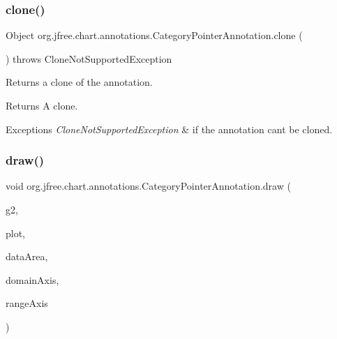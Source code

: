 \subsubsection{\texorpdfstring{clone()}{clone()}}
{\footnotesize\ttfamily Object org.\+jfree.\+chart.\+annotations.\+Category\+Pointer\+Annotation.\+clone (\begin{DoxyParamCaption}{ }\end{DoxyParamCaption}) throws Clone\+Not\+Supported\+Exception}

Returns a clone of the annotation.

\begin{DoxyReturn}{Returns}
A clone.
\end{DoxyReturn}

\begin{DoxyExceptions}{Exceptions}
{\em Clone\+Not\+Supported\+Exception} & if the annotation can\textquotesingle{}t be cloned. \\
\hline
\end{DoxyExceptions}
\mbox{\label{classorg_1_1jfree_1_1chart_1_1annotations_1_1_category_pointer_annotation_a601e21ffb2b2ee40f8ba7f0a6bd97626}} 
\subsubsection{\texorpdfstring{draw()}{draw()}}
{\footnotesize\ttfamily void org.\+jfree.\+chart.\+annotations.\+Category\+Pointer\+Annotation.\+draw (\begin{DoxyParamCaption}\item[{Graphics2D}]{g2,  }\item[{\mbox{\hyperlink{classorg_1_1jfree_1_1chart_1_1plot_1_1_category_plot}{Category\+Plot}}}]{plot,  }\item[{Rectangle2D}]{data\+Area,  }\item[{\mbox{\hyperlink{classorg_1_1jfree_1_1chart_1_1axis_1_1_category_axis}{Category\+Axis}}}]{domain\+Axis,  }\item[{\mbox{\hyperlink{classorg_1_1jfree_1_1chart_1_1axis_1_1_value_axis}{Value\+Axis}}}]{range\+Axis }\end{DoxyParamCaption})}

